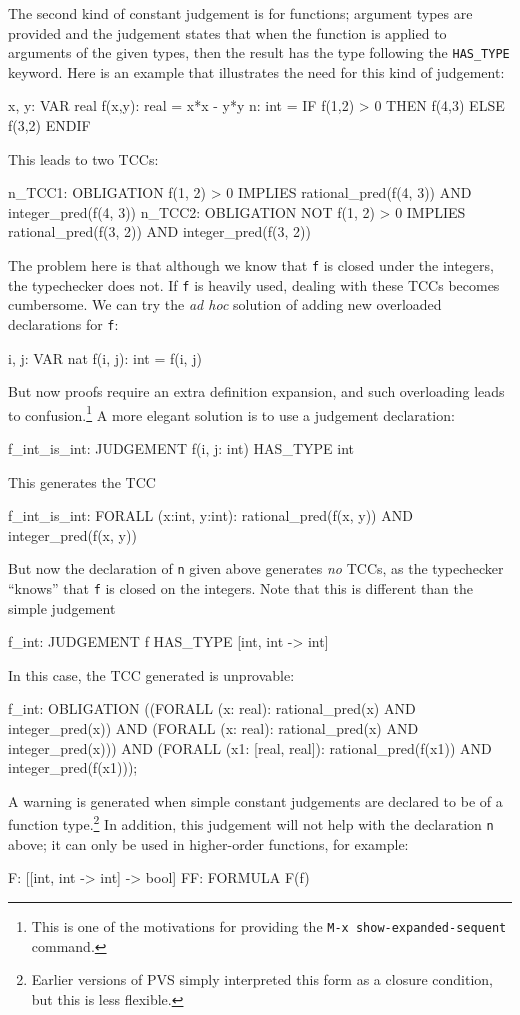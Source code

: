 The second kind of constant judgement is for functions; argument types are
provided and the judgement states that when the function is applied to
arguments of the given types, then the result has the type following the
\texttt{HAS\_TYPE} keyword.  Here is an example that illustrates the need
for this kind of judgement:
\begin{pvsex}
  x, y: VAR real
  f(x,y): real = x*x - y*y
  n: int = IF f(1,2) > 0 THEN f(4,3) ELSE f(3,2) ENDIF
\end{pvsex}
This leads to two TCCs:
\begin{pvsex}
  n_TCC1: OBLIGATION
    f(1, 2) > 0 IMPLIES
      rational_pred(f(4, 3)) AND integer_pred(f(4, 3))
  n_TCC2: OBLIGATION
    NOT f(1, 2) > 0 IMPLIES
      rational_pred(f(3, 2)) AND integer_pred(f(3, 2))
\end{pvsex}
The problem here is that although we know that \texttt{f} is closed under
the integers, the typechecker does not.  If \texttt{f} is heavily used,
dealing with these TCCs becomes cumbersome.  We can try the \emph{ad hoc}
solution of adding new overloaded declarations for \texttt{f}:
\begin{pvsex}
  i, j: VAR nat
  f(i, j): int = f(i, j)
\end{pvsex}
But now proofs require an extra definition expansion, and such overloading
leads to confusion.\footnote{This is one of the motivations for providing
the \texttt{M-x~show-expanded-sequent} command.}  A more elegant solution
is to use a judgement declaration:
\begin{pvsex}
  f_int_is_int: JUDGEMENT f(i, j: int) HAS\_TYPE int
\end{pvsex}
This generates the TCC
\begin{pvsex}
  f_int_is_int: FORALL (x:int, y:int):
                  rational_pred(f(x, y)) AND integer_pred(f(x, y))
\end{pvsex}
But now the declaration of \texttt{n} given above generates \emph{no}
TCCs, as the typechecker ``knows'' that \texttt{f} is closed on the
integers.  Note that this is different than the simple judgement
\begin{pvsex}
  f_int: JUDGEMENT f HAS\_TYPE [int, int -> int]
\end{pvsex}
In this case, the TCC generated is unprovable:
\begin{pvsex}
  f_int: OBLIGATION
    ((FORALL (x: real): rational_pred(x) AND integer_pred(x)) AND
      (FORALL (x: real): rational_pred(x) AND integer_pred(x)))
     AND
     (FORALL (x1: [real, real]): rational_pred(f(x1)) AND integer_pred(f(x1)));
\end{pvsex}
A warning is generated when simple constant judgements are declared to be
of a function type.\footnote{Earlier versions of PVS simply interpreted
this form as a closure condition, but this is less flexible.}  In
addition, this judgement will not help with the declaration \texttt{n}
above; it can only be used in higher-order functions, for example:
\begin{pvsex}
  F: [[int, int -> int] -> bool]
  FF: FORMULA F(f)
\end{pvsex}

